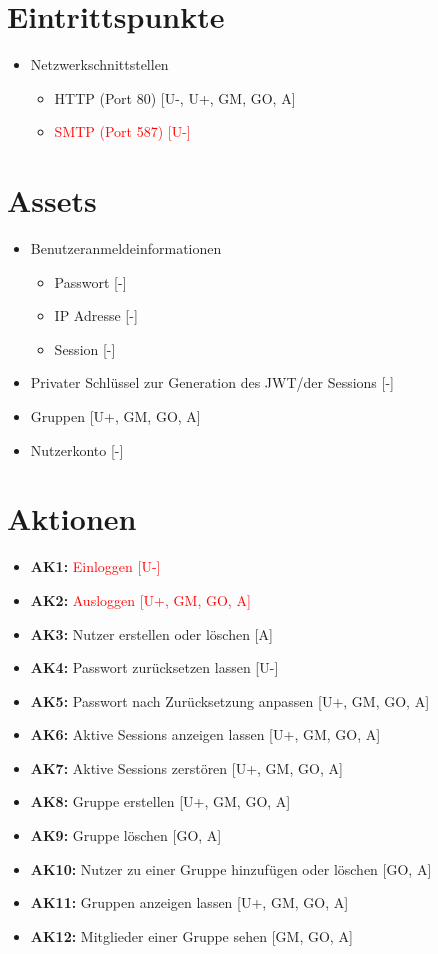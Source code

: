 \documentclass[12pt,DIV14,BCOR10mm,a4paper,parskip=half-,english,ngerman,bibliography=totocnumbered]{scrreprt}
\begin{document}
\chapter{Eintrittspunkte}

\begin{itemize}
  \item Netzwerkschnittstellen
  \begin{itemize}
    \item HTTP (Port 80)  [U-, U+, GM, GO, A]
    \item \textcolor{red}{SMTP (Port 587) [U-]}
  \end{itemize}
\end{itemize}

\chapter{Assets}

\begin{itemize}
  \item Benutzeranmeldeinformationen
  \begin{itemize}
    \item Passwort [-]
    \item IP Adresse [-]
    \item Session [-]
  \end{itemize}
  \item Privater Schlüssel zur Generation des JWT/der Sessions [-]
  \item Gruppen [U+, GM, GO, A]
  \item Nutzerkonto [-]
\end{itemize}

\chapter{Aktionen}

\begin{itemize}
  \item \textbf{AK1:} \textcolor{red}{Einloggen [U-]}
  \item \textbf{AK2:} \textcolor{red}{Ausloggen [U+, GM, GO, A]}
  \item \textbf{AK3:} Nutzer erstellen oder löschen [A]
  \item \textbf{AK4:} Passwort zurücksetzen lassen [U-]
  \item \textbf{AK5:} Passwort nach Zurücksetzung anpassen [U+, GM, GO, A]
  \item \textbf{AK6:} Aktive Sessions anzeigen lassen [U+, GM, GO, A]
  \item \textbf{AK7:} Aktive Sessions zerstören [U+, GM, GO, A]
  \item \textbf{AK8:} Gruppe erstellen [U+, GM, GO, A]
  \item \textbf{AK9:} Gruppe löschen [GO, A]
  \item \textbf{AK10:} Nutzer zu einer Gruppe hinzufügen oder löschen [GO, A]
  \item \textbf{AK11:} Gruppen anzeigen lassen [U+, GM, GO, A]
  \item \textbf{AK12:} Mitglieder einer Gruppe sehen [GM, GO, A]
\end{itemize}
\end{document}
